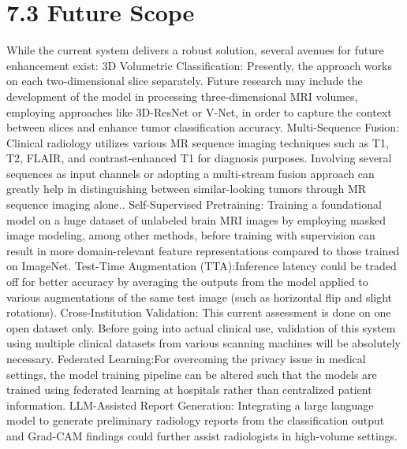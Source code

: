 \documentclass[12pt,a4paper,oneside]{report}
\begin{document}
\section{7.3 Future Scope}
While the current system delivers a robust solution, several avenues for future enhancement exist:
3D Volumetric Classification: Presently, the approach works on each two-dimensional slice separately. Future research may include the development of the model in processing three-dimensional MRI volumes, employing approaches like 3D-ResNet or V-Net, in order to capture the context between slices and enhance tumor classification accuracy.
Multi-Sequence Fusion: Clinical radiology utilizes various MR sequence imaging techniques such as T1, T2, FLAIR, and contrast-enhanced T1 for diagnosis purposes. Involving several sequences as input channels or adopting a multi-stream fusion approach can greatly help in distinguishing between similar-looking tumors through MR sequence imaging alone..
Self-Supervised Pretraining: Training a foundational model on a huge dataset of unlabeled brain MRI images by employing masked image modeling, among other methods, before training with supervision can result in more domain-relevant feature representations compared to those trained on ImageNet.
Test-Time Augmentation (TTA):Inference latency could be traded off for better accuracy by averaging the outputs from the model applied to various augmentations of the same test image (such as horizontal flip and slight rotations).
Cross-Institution Validation: This current assessment is done on one open dataset only. Before going into actual clinical use, validation of this system using multiple clinical datasets from various scanning machines will be absolutely necessary.
Federated Learning:For overcoming the privacy issue in medical settings, the model training pipeline can be altered such that the models are trained using federated learning at hospitals rather than centralized patient information.
LLM-Assisted Report Generation: Integrating a large language model to generate preliminary radiology reports from the classification output and Grad-CAM findings could further assist radiologists in high-volume settings.
\end{document}

